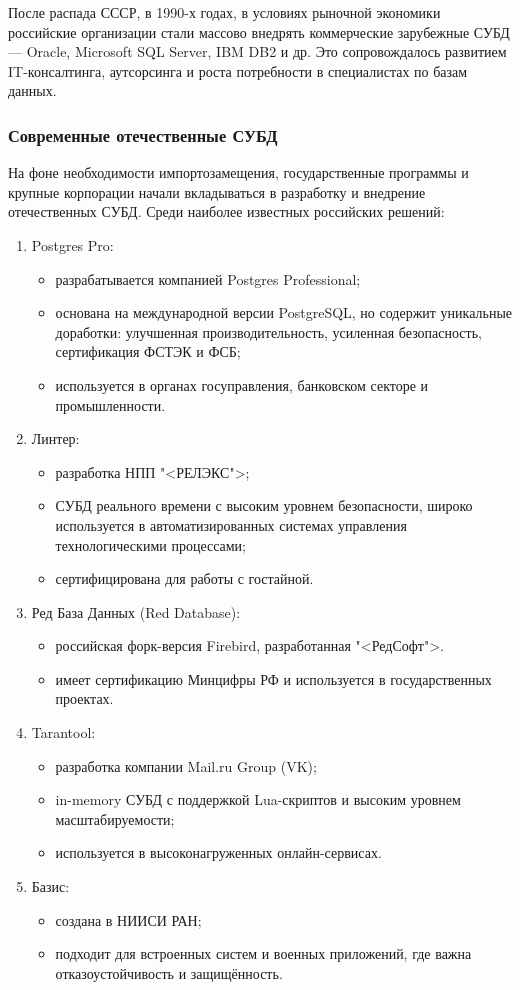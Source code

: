 После распада СССР, в 1990-х годах, в условиях рыночной экономики российские организации стали массово внедрять коммерческие зарубежные СУБД — Oracle, Microsoft SQL Server, IBM DB2 и др. Это сопровождалось развитием IT-консалтинга, аутсорсинга и роста потребности в специалистах по базам данных.

\subsubsection{Современные отечественные СУБД}

На фоне необходимости импортозамещения, государственные программы и крупные корпорации начали вкладываться в разработку и внедрение отечественных СУБД. Среди наиболее известных российских решений:
\begin{enumerate}
	\item Postgres Pro:
	\begin{itemize}
		\item разрабатывается компанией Postgres Professional;
		\item основана на международной версии PostgreSQL, но содержит уникальные доработки: улучшенная производительность, усиленная безопасность, сертификация ФСТЭК и ФСБ;
		\item используется в органах госуправления, банковском секторе и промышленности.
	\end{itemize}
	\item Линтер:
	\begin{itemize}
		\item разработка НПП "<РЕЛЭКС">;
		\item СУБД реального времени с высоким уровнем безопасности, широко используется в автоматизированных системах управления технологическими процессами;
		\item сертифицирована для работы с гостайной.
	\end{itemize}
	\item Ред База Данных (Red Database):
	\begin{itemize}
		\item российская форк-версия Firebird, разработанная "<РедСофт">.
		\item имеет сертификацию Минцифры РФ и используется в государственных проектах.
	\end{itemize}
	\item Tarantool:
	\begin{itemize}
		\item разработка компании Mail.ru Group (VK);
		\item in-memory СУБД с поддержкой Lua-скриптов и высоким уровнем масштабируемости;
		\item используется в высоконагруженных онлайн-сервисах.
	\end{itemize}
	\item Базис:
	\begin{itemize}
		\item создана в НИИСИ РАН;
		\item подходит для встроенных систем и военных приложений, где важна отказоустойчивость и защищённость.
	\end{itemize}
\end{enumerate}

